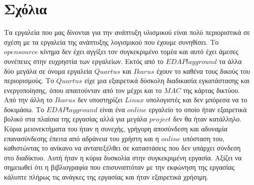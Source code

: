 \documentclass{report}
\begin{document}
\section*{Σχόλια}
Τα εργαλεία που μας δίνονται για την ανάπτυξη υλισμικού είναι πολύ περιοριστικά σε 
σχέση με τα εργαλεία της ανάπτυξης λογισμικού που έχουμε συνηθίσει. Το $open source$ 
κίνημα δεν έχει αγγίξει τον συγκεκριμένο τομέα και αυτό έχει άμεσες συνέπειες στην 
ευχρηστία των εργαλείων. Εκτός από το $EDA Playground$ τα άλλα δύο μεγάλα σε όνομα 
εργαλεία $Quartus$ και $Ikarus$ έχουν το καθένα τους δικούς του περιορισμούς. Το 
$Quartus$ είχε μια εξαιρετικά δύσκολη διαδικασία εγκατάστασης και ενεργοποίησης, όπου 
απαιτούνταν από τον μέχρι και το $MAC$ της κάρτας δικτύου. Από την άλλη το $Ikarus$
δεν υποστηρίζει $Linux$ υπολογιστές και δεν μπόρεσα να το δοκιμάσω. Το $EDA Playground$
είναι ένα $online$ εργαλείο το οποίο ήταν εξαιρετικά βολικό στα πλαίσια της εργασίας αλλά
για μεγάλα $project$ δεν θα ήταν κατάλληλο. Κύρια μειονεκτήματα του ήταν η συνεχής,  
γρήγορη αποσύνδεση και αδυναμία επανασύνδεσης έπειτα από αδράνεια του χρήστη και η
$online$ υπόσταση του, καθιστώντας το ανίκανο να ανταπεξέλθει σε καταστάσεις που δεν 
υπάρχει σύνδεση στο διαδίκτυο. Αυτή ήταν η κύρια δυσκολία στην συγκεκριμένη εργασία. 
Αξίζει να σημειωθεί ότι η βιβλιογραφία που επισυναπτόταν με την εκφώνηση της εργασίας 
κάλυπτε πλήρως τις ανάγκες της εργασίας και ήταν εξαιρετικά χρήσιμη.
\end{document}
